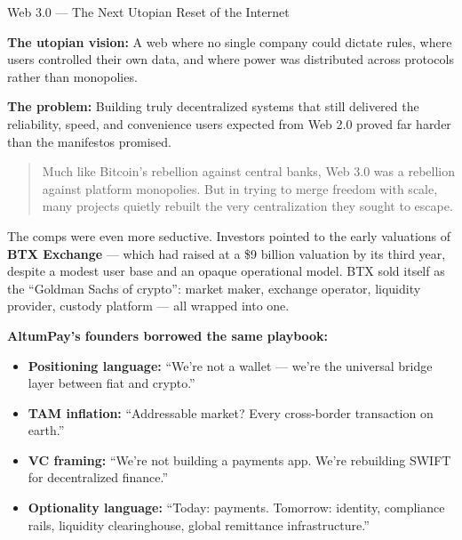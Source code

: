 \begin{HistoricalSidebar}{Web 3.0 --- The Next Utopian Reset of the Internet}
    \medskip
    
    \textbf{The utopian vision:}  
    A web where no single company could dictate rules, where users controlled their own data, and where power was distributed across protocols rather than monopolies.
    
    \medskip
    
    \textbf{The problem:}  
    Building truly decentralized systems that still delivered the reliability, speed, and convenience users expected from Web 2.0 proved far harder than the manifestos promised.
    
    \medskip
    
    \begin{quote}
    Much like Bitcoin’s rebellion against central banks,  
    Web 3.0 was a rebellion against platform monopolies.  
    But in trying to merge freedom with scale,  
    many projects quietly rebuilt the very centralization they sought to escape.
    \end{quote}
    
\end{HistoricalSidebar}

\medskip

The comps were even more seductive.  
Investors pointed to the early valuations of \textbf{BTX Exchange} --- which had raised at a \$9 billion valuation by its third year, despite a modest user base and an opaque operational model. BTX sold itself as the ``Goldman Sachs of crypto'':  
market maker, exchange operator, liquidity provider, custody platform --- all wrapped into one.

\medskip

\textbf{AltumPay’s founders borrowed the same playbook:}

\begin{itemize}
  \item \textbf{Positioning language:} ``We’re not a wallet --- we’re the universal bridge layer between fiat and crypto.''
  \item \textbf{TAM inflation:} ``Addressable market? Every cross-border transaction on earth.''
  \item \textbf{VC framing:} ``We’re not building a payments app. We’re rebuilding SWIFT for decentralized finance.''
  \item \textbf{Optionality language:} ``Today: payments. Tomorrow: identity, compliance rails, liquidity clearinghouse, global remittance infrastructure.''
\end{itemize}

